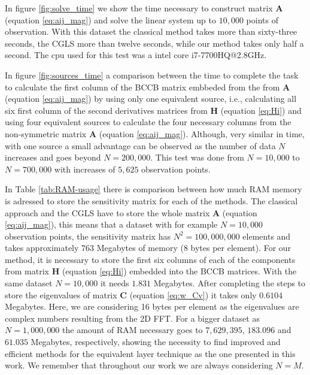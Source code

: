 In figure \ref{fig:solve_time} we show the time necessary to construct matrix $\mathbf{A}$ (equation \ref{eq:aij_mag}) and solve the linear system up to $10,000$ points of observation. With this dataset the classical method takes more than sixty-three seconds, the CGLS more than twelve seconds, while our method takes only half a second. The cpu used for this test was a intel core i7-7700HQ@2.8GHz.

In figure \ref{fig:sources_time} a comparison between the time to complete the task to calculate the first column of the BCCB matrix embbeded from the from $\mathbf{A}$ (equation \ref{eq:aij_mag}) by using only one equivalent source, i.e., calculating all six first column of the second derivatives matrices from $\mathbf{H}$ (equation \ref{eq:Hi}) and using four equivalent sources to calculate the four necessary columns from the non-symmetric matrix $\mathbf{A}$ (equation \ref{eq:aij_mag}). Although, very similar in time, with one source a small advantage can be observed as the number of data $N$ increases and goes beyond $N = 200,000$. This test was done from $N = 10,000$ to $N = 700,000$ with increases of $5,625$ observation points.

In Table \ref{tab:RAM-usage} there is comparison between how much RAM memory is adressed to store the sensitivity matrix for each of the methods. The classical approach and the CGLS have to store the whole matrix $\mathbf{A}$ (equation \ref{eq:aij_mag}), this means that a dataset  with for example $N = 10,000$ observation points, the sensitivity matrix has $N^2 = 100,000,000$ elements and takes approximately $763$ Megabytes of memory (8 bytes per element). For our method, it is necessary to store the first six columns of each of the components from matrix $\mathbf{H}$ (equation \ref{eq:Hi}) embedded into the BCCB matrices. With the same dataset $N = 10,000$ it needs $1.831$ Megabytes. After completing the steps to store the eigenvalues of matrix $\mathbf{C}$ (equation \ref{eq:w_Cv}) it takes only $0.6104$ Megabytes. Here, we are considering 16 bytes per element as the eigenvalues are complex numbers resulting from the 2D FFT. For a bigger dataset as $N = 1,000,000$ the amount of RAM necessary goes to $7,629,395$, $183.096$ and $61.035$ Megabytes, respectively, showing the necessity to find improved and efficient methods for the equivalent layer technique as the one presented in this work. We remember that throughout our work we are always considering $N = M$.










